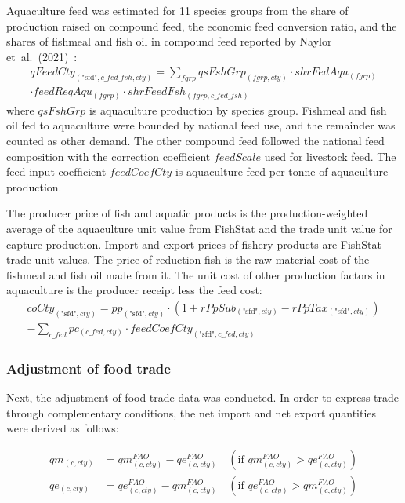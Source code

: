 Aquaculture feed was estimated for 11 species groups from the share of production raised on compound feed, the economic feed conversion ratio, and the shares of fishmeal and fish oil in compound feed reported by Naylor et~al.~(2021)~\cite{naylorRetrospectiveReviewGlobal2021}:
\begin{multline}
qFeedCty_{(\text{"sfd"},c\_fed\_fsh,cty)}
= \sum_{fgrp} qsFshGrp_{(fgrp,cty)} \cdot shrFedAqu_{(fgrp)}
\\[-0.3em]
\cdot feedReqAqu_{(fgrp)} \cdot shrFeedFsh_{(fgrp,c\_fed\_fsh)}
\end{multline}
where \( qsFshGrp \) is aquaculture production by species group. 
Fishmeal and fish oil fed to aquaculture were bounded by national feed use, and the remainder was counted as other demand. 
The other compound feed followed the national feed composition with the correction coefficient \(feedScale\) used for livestock feed. 
The feed input coefficient \(feedCoefCty\) is aquaculture feed per tonne of aquaculture production.

The producer price of fish and aquatic products is the production-weighted average of the aquaculture unit value from FishStat and the trade unit value for capture production. 
Import and export prices of fishery products are FishStat trade unit values. 
The price of reduction fish is the raw-material cost of the fishmeal and fish oil made from it. 
The unit cost of other production factors in aquaculture is the producer receipt less the feed cost:
\begin{multline}
coCty_{(\text{"sfd"},cty)} = pp_{(\text{"sfd"},cty)}\cdot(1+rPpSub_{(\text{"sfd"},cty)}-rPpTax_{(\text{"sfd"},cty)})
\\[-0.3em]
- \sum_{c\_fed} pc_{(c\_fed,cty)}\cdot feedCoefCty_{(\text{"sfd"},c\_fed,cty)}
\end{multline}


\subsubsection{Adjustment of food trade}

Next, the adjustment of food trade data was conducted. 
In order to express trade through complementary conditions, 
the net import and net export quantities were derived as follows:

\begin{align}
qm_{(c,cty)} &= qm^{FAO}_{(c,cty)} - qe^{FAO}_{(c,cty)}
\quad (\text{if } qm^{FAO}_{(c,cty)} > qe^{FAO}_{(c,cty)}) \\
qe_{(c,cty)} &= qe^{FAO}_{(c,cty)} - qm^{FAO}_{(c,cty)}
\quad (\text{if } qe^{FAO}_{(c,cty)} > qm^{FAO}_{(c,cty)})
\end{align}

